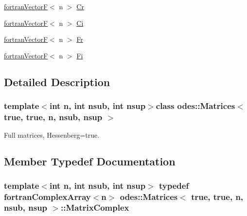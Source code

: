 \begin{DoxyCompactItemize}
\item 
\hyperlink{classodes_1_1fortranVectorF}{fortran\+Vector\+F}$<$ n $>$ \hyperlink{classodes_1_1Matrices_3_01true_00_01true_00_01n_00_01nsub_00_01nsup_01_4_a9b0fa0b5ed5e60ea4d2a34c3bcccfdb4}{Cr}
\item 
\hyperlink{classodes_1_1fortranVectorF}{fortran\+Vector\+F}$<$ n $>$ \hyperlink{classodes_1_1Matrices_3_01true_00_01true_00_01n_00_01nsub_00_01nsup_01_4_aa8634c8ad1096a2027f60cd7c90c480f}{Ci}
\item 
\hyperlink{classodes_1_1fortranVectorF}{fortran\+Vector\+F}$<$ n $>$ \hyperlink{classodes_1_1Matrices_3_01true_00_01true_00_01n_00_01nsub_00_01nsup_01_4_abc0c64728be747fdf198936dc511dd0b}{Fr}
\item 
\hyperlink{classodes_1_1fortranVectorF}{fortran\+Vector\+F}$<$ n $>$ \hyperlink{classodes_1_1Matrices_3_01true_00_01true_00_01n_00_01nsub_00_01nsup_01_4_a39f0af29fa7e21db0d0a88581ae291a9}{Fi}
\end{DoxyCompactItemize}


\subsection{Detailed Description}
\subsubsection*{template$<$int n, int nsub, int nsup$>$class odes\+::\+Matrices$<$ true, true, n, nsub, nsup $>$}

Full matrices, Hessenberg=true. 

\subsection{Member Typedef Documentation}
\hypertarget{classodes_1_1Matrices_3_01true_00_01true_00_01n_00_01nsub_00_01nsup_01_4_a2325063092d57345f62b8a0d38c0632b}{}
\subsubsection[{Matrix\+Complex}]{\setlength{\rightskip}{0pt plus 5cm}template$<$int n, int nsub, int nsup$>$ typedef {\bf fortran\+Complex\+Array}$<$n$>$ {\bf odes\+::\+Matrices}$<$ true, true, n, nsub, nsup $>$\+::{\bf Matrix\+Complex}}\label{classodes_1_1Matrices_3_01true_00_01true_00_01n_00_01nsub_00_01nsup_01_4_a2325063092d57345f62b8a0d38c0632b}
\hypertarget{classodes_1_1Matrices_3_01true_00_01true_00_01n_00_01nsub_00_01nsup_01_4_a9c13d85a737f0806d9cfff89d3d59c52}{}
